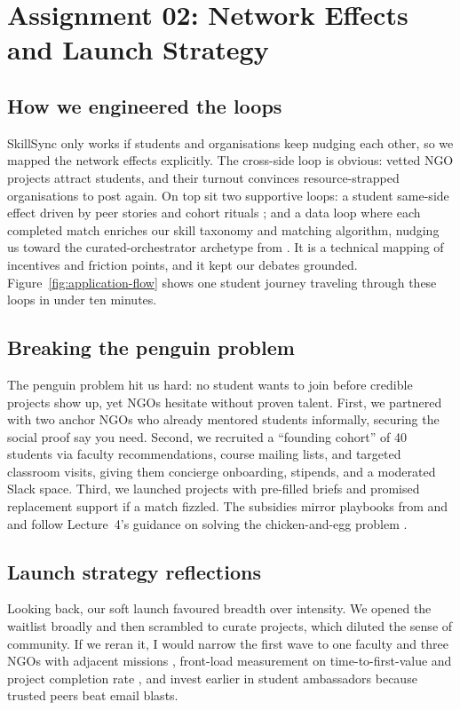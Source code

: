 \section*{Assignment 02: Network Effects and Launch Strategy}

\subsection*{How we engineered the loops}
SkillSync only works if students and organisations keep nudging each other, so we mapped the network effects explicitly. The cross-side loop is obvious: vetted NGO projects attract students, and their turnout convinces resource-strapped organisations to post again. On top sit two supportive loops: a student same-side effect driven by peer stories and cohort rituals \citep{Choudary2016}; and a data loop where each completed match enriches our skill taxonomy and matching algorithm, nudging us toward the curated-orchestrator archetype from \citet{Reillier2017}. It is a technical mapping of incentives and friction points, and it kept our debates grounded. Figure~\ref{fig:application-flow} shows one student journey traveling through these loops in under ten minutes.

\subsection*{Breaking the penguin problem}
The penguin problem hit us hard: no student wants to join before credible projects show up, yet NGOs hesitate without proven talent. First, we partnered with two anchor NGOs who already mentored students informally, securing the social proof \citet{HagiuWright2013} say you need. Second, we recruited a ``founding cohort'' of 40 students via faculty recommendations, course mailing lists, and targeted classroom visits, giving them concierge onboarding, stipends, and a moderated Slack space. Third, we launched projects with pre-filled briefs and promised replacement support if a match fizzled. The subsidies mirror playbooks from \citet{Gunasilan2024} and \citet{FarrellSaloner1986} and follow Lecture~4's guidance on solving the chicken-and-egg problem \citep{Lecture04}.

\subsection*{Launch strategy reflections}
Looking back, our soft launch favoured breadth over intensity. We opened the waitlist broadly and then scrambled to curate projects, which diluted the sense of community. If we reran it, I would narrow the first wave to one faculty and three NGOs with adjacent missions \citep{Choudary2016}, front-load measurement on time-to-first-value and project completion rate \citep{ShapiroVarian1999}, and invest earlier in student ambassadors because trusted peers beat email blasts.


